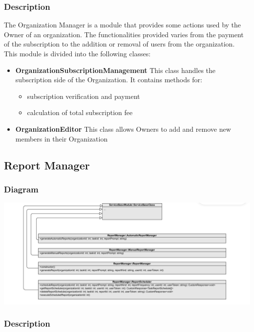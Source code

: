 \documentclass{article}
\begin{document}
\subsubsection{Description}
The Organization Manager is a module that provides some actions used by the Owner of an organization.
The functionalities provided varies from the payment of the subscription to the addition or removal of users from the organization.
This module is divided into the following classes:
\begin{itemize}
    \item \textbf{OrganizationSubscriptionManagement}
    This class handles the subscription side of the Organization. It contains methods for:
    \begin{itemize}
        \item subscription verification and payment
        \item calculation of total subscription fee
    \end{itemize}
    \item \textbf{OrganizationEditor}
    This class allows Owners to add and remove new members in their Organization
\end{itemize}%
\subsection{Report Manager} %

\subsubsection{Diagram}

\includegraphics[width=\textwidth,height=\textheight,keepaspectratio]{images/class_diagram/reportManager.jpg}

\subsubsection{Description}
\end{document}
